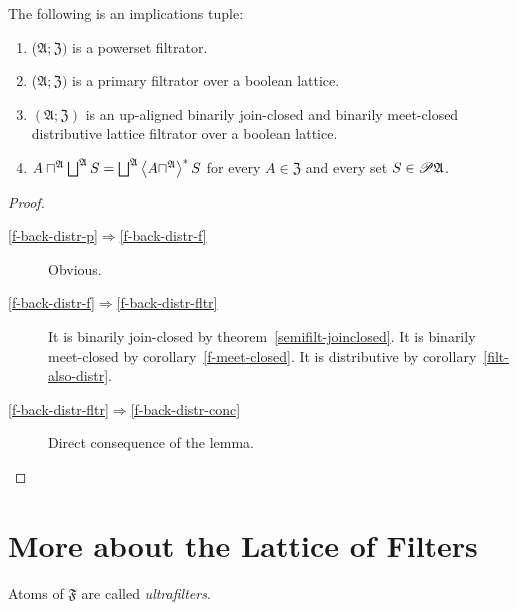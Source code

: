 \begin{thm}
\label{b-f-back-distr}The following is an implications tuple:
\begin{enumerate}
\item \label{f-back-distr-p}($\mathfrak{A};\mathfrak{Z})$ is a powerset filtrator.
\item \label{f-back-distr-f}($\mathfrak{A};\mathfrak{Z})$ is a primary filtrator over
a boolean lattice.
\item \label{f-back-distr-fltr}$(\mathfrak{A};\mathfrak{Z})$ is an up-aligned
binarily join-closed and binarily meet-closed distributive lattice
filtrator over a boolean lattice.
\item \label{f-back-distr-conc}$A\sqcap^{\mathfrak{A}}\bigsqcup^{\mathfrak{A}}S=\bigsqcup^{\mathfrak{A}}\left\langle A\sqcap^{\mathfrak{A}}\right\rangle ^{\ast}S$
for every $A\in\mathfrak{Z}$ and every set $S\in\mathscr{P}\mathfrak{A}$.
\end{enumerate}
\end{thm}
\begin{proof}
~
\begin{description}
\item [{\ref{f-back-distr-p}$\Rightarrow$\ref{f-back-distr-f}}] Obvious.
\item [{\ref{f-back-distr-f}$\Rightarrow$\ref{f-back-distr-fltr}}] It is binarily join-closed by theorem~\ref{semifilt-joinclosed}.
It is binarily meet-closed by corollary~\ref{f-meet-closed}. It is distributive by
corollary~\ref{filt-also-distr}.
\item [{\ref{f-back-distr-fltr}$\Rightarrow$\ref{f-back-distr-conc}}] Direct
consequence of the lemma.
\end{description}
\end{proof}

\section{More about the Lattice of Filters}
\begin{defn}
Atoms of $\mathfrak{F}$ are called \emph{ultrafilters}.
\end{defn}

